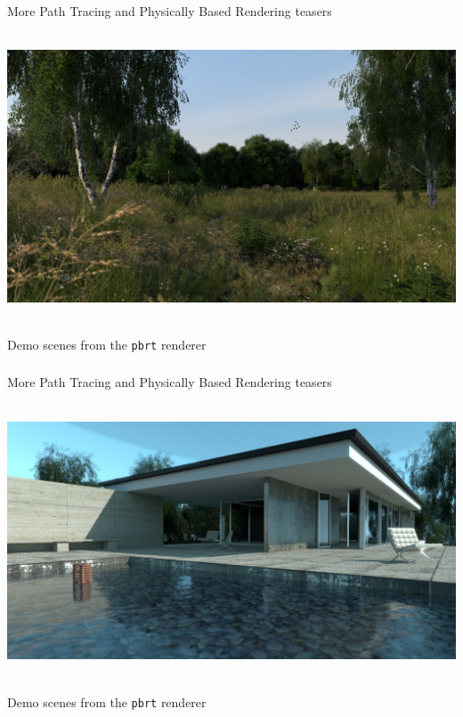 \documentclass[utf8,stillsansserifmath,fleqn,t]{beamer}
\newcommand{\code}[1]{\texttt{#1}}
\begin{document}
\begin{frame}
\frametitle{\insertsection}
More Path Tracing and Physically Based Rendering teasers\\~\\
\begin{minipage}{.8\textwidth}
\includegraphics[width=\textwidth]{./fig/pbrt-landscape.jpg}
\end{minipage}\\\vfill
Demo scenes from the \code{pbrt} renderer
\end{frame}

\begin{frame}
\frametitle{\insertsection}
More Path Tracing and Physically Based Rendering teasers\\~\\
\begin{minipage}{.85\textwidth}
\includegraphics[width=\textwidth]{./fig/pbrt-pavillion-day.jpg}
\end{minipage}\\\vfill
Demo scenes from the \code{pbrt} renderer
\end{frame}
\end{document}

